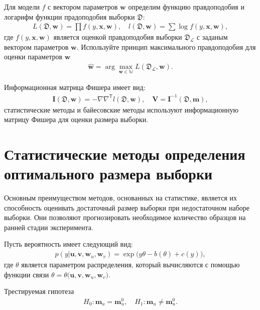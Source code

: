 Для модели $f$ с вектором параметров $\textbf{w}$ определим функцию правдоподобия и логарифм функции прадоподобия выборки $\mathfrak{D}$:
\[
\label{eq:ps:4}
\begin{aligned}
	L\left(\mathfrak{D}, \textbf{w}\right) = \prod f\left(y,\textbf{x}, \textbf{w}\right),\quad l\left(\mathfrak{D}, \textbf{w}\right) = \sum \log f\left(y,\textbf{x}, \textbf{w}\right),
\end{aligned}
\]
где $f(y,\textbf{x}, \textbf{w})$ является оценкой правдоподобия выборки $\mathfrak{D}_{\mathcal{L}}$ с заданым вектором параметров $\textbf{w}$.
Используйте принцип максимального правдоподобия для оценки параметров $\textbf{w}$
\[
\label{eq:ps:5}
\begin{aligned}
	\hat{\textbf{w}} = \arg\max_{\textbf{w}\in\mathbb{W}}L\left(\mathfrak{D}_{\mathcal{L}}, \textbf{w}\right).
\end{aligned}
\]

Информационная матрица Фишера имеет вид:
\[
\label{eq:ps:6}
\begin{aligned}
	\textbf{I}\left(\mathfrak{D}, \textbf{w}\right) = -\nabla\nabla^{\mathsf{T}}l\left(\mathfrak{D}, \textbf{w}\right), \quad  \textbf{V} = \textbf{I}^{-1}\left(\mathfrak{D}, \textbf{m}\right),
\end{aligned}
\]
статистические методы и байесовские методы используют информационную матрицу Фишера для оценки размера выборки.

\section{Статистические методы определения оптимального размера выборки}
Основным преимуществом методов, основанных на статистике, является их способность оценивать достаточный размер выборки при недостаточном наборе выборки. Они позволяют прогнозировать необходимое количество образцов на ранней стадии эксперимента.

Пусть вероятность имеет следующий вид:
\[
\label{eq:sb:1}
\begin{aligned}
	p(y|\textbf{u},\textbf{v},\textbf{w}_{u},\textbf{w}_{v}) = \exp\bigl(y\theta- b(\theta) + c\left(y\right)\bigr),
\end{aligned}
\]
где $\theta$ является параметром распределения, который вычисляются с помощью функции связи $\theta=\theta\bigr(\textbf{u},\textbf{v},\textbf{w}_{u},\textbf{w}_{v}\bigr)$.

Трестируемая гипотеза
\[
\label{eq:sb:2}
\begin{aligned}
	H_0: \textbf{m}_{u} = \textbf{m}^0_{u}, \quad H_1: \textbf{m}_{u} \not= \textbf{m}^0_{u}.
\end{aligned}
\]

